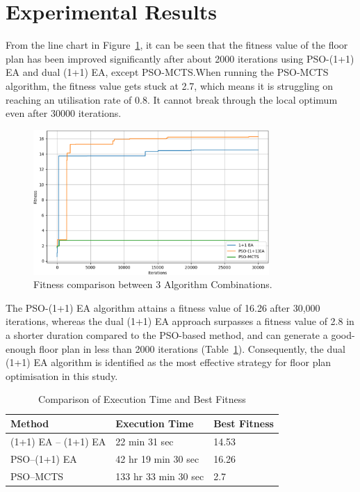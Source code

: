 \documentclass[]{article}
\begin{document}
\section{Experimental Results}
From the line chart in Figure~\ref{fig:compare-3algorithm}, it can be seen that the fitness value of the floor plan has been improved significantly after about 2000 iterations using PSO-(1+1) EA and dual (1+1) EA, except PSO-MCTS.\@ When running the PSO-MCTS algorithm, the fitness value gets stuck at 2.7, which means it is struggling on reaching an utilisation rate of 0.8. It cannot break through the local optimum even after 30000 iterations.
\begin{figure}[h]
    \centering
    \includegraphics[width=0.8\textwidth]{images/compare-3algorithm.png}
    \caption{Fitness comparison between 3 Algorithm Combinations.}
    \label{fig:compare-3algorithm}
\end{figure}

The PSO-(1+1) EA algorithm attains a fitness value of 16.26 after 30,000 iterations, whereas the dual (1+1) EA approach surpasses a fitness value of 2.8 in a shorter duration compared to the PSO-based method, and can generate a good-enough floor plan in less than 2000 iterations (Table~\ref{tab:algorithm_comparison}). Consequently, the dual (1+1) EA algorithm is identified as the most effective strategy for floor plan optimisation in this study.
\begin{table}[h]
    \centering
    \caption{Comparison of Execution Time and Best Fitness}
    \label{tab:algorithm_comparison}
    \begin{tabularx}{\textwidth}{l | l | l}
        \hline
        \textbf{Method}      & \textbf{Execution Time} & \textbf{Best Fitness} \\
        \hline
        (1+1) EA -- (1+1) EA & 22 min 31 sec           & 14.53                 \\
        PSO--(1+1) EA        & 42 hr 19 min 30 sec     & 16.26                 \\
        PSO--MCTS            & 133 hr 33 min 30 sec    & 2.7                   \\
        \hline
    \end{tabularx}
\end{table}
\end{document}
